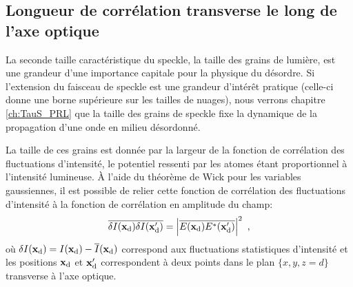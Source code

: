 \subsection{Longueur de corrélation transverse le long de l'axe optique}
La seconde taille caractéristique du speckle, la taille des grains de lumière, est une grandeur d'une importance capitale pour la physique du désordre. Si l'extension du faisceau de speckle est une grandeur d'intérêt pratique (celle-ci donne une borne supérieure sur les tailles de nuages), nous verrons chapitre \ref{ch:TauS_PRL} que la taille des grains de speckle fixe la dynamique de la propagation d'une onde en milieu désordonné.

La taille de ces grains est donnée par la largeur de la fonction de corrélation des fluctuations d'intensité, le potentiel ressenti par les atomes étant proportionnel à l'intensité lumineuse. À l'aide du théorème de Wick pour les variables gaussiennes, il est possible de relier cette fonction de corrélation des fluctuations d'intensité à la fonction de corrélation en amplitude du champ:
\begin{equation}
\overline{\delta I(\mathbf{x}_{\mathrm{d}}) \delta I(\mathbf{x}_{\mathrm{d}}')} = \left| \overline{E(\mathbf{x}_{\mathrm{d}})E^*(\mathbf{x}_{\mathrm{d}}')} \right|^2 \text{ ,}
\end{equation}
où $\delta I(\mathbf{x}_{\mathrm{d}})=I(\mathbf{x}_{\mathrm{d}})-\overline{I}(\mathbf{x}_{\mathrm{d}})$ correspond aux fluctuations statistiques d'intensité et les positions $\mathbf{x}_{\mathrm{d}}$ et $\mathbf{x}_{\mathrm{d}}'$ correspondent à deux points dans le plan $\lbrace x,y,z=d\rbrace$ transverse à l'axe optique. 


